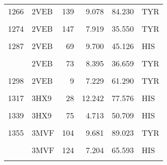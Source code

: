 \begin{table}
\begin{tabular}{llrrrl}
			1266 & 2VEB & 139 & 9.078 & 84.230 & TYR\\
			\addlinespace
			\cellcolor{gray!6}{1268} & \cellcolor{gray!6}{2VEB} & \cellcolor{gray!6}{141} & \cellcolor{gray!6}{4.252} & \cellcolor{gray!6}{67.226} & \cellcolor{gray!6}{TYR}\\
			1274 & 2VEB & 147 & 7.919 & 35.550 & TYR\\
			\cellcolor{gray!6}{1285} & \cellcolor{gray!6}{2VEB} & \cellcolor{gray!6}{61} & \cellcolor{gray!6}{7.823} & \cellcolor{gray!6}{23.496} & \cellcolor{gray!6}{TYR}\\
			1287 & 2VEB & 69 & 9.700 & 45.126 & HIS\\
			\cellcolor{gray!6}{1291} & \cellcolor{gray!6}{2VEB} & \cellcolor{gray!6}{72} & \cellcolor{gray!6}{10.947} & \cellcolor{gray!6}{86.614} & \cellcolor{gray!6}{TYR}\\
			\addlinespace
			1292 & 2VEB & 73 & 8.395 & 36.659 & TYR\\
			\cellcolor{gray!6}{1295} & \cellcolor{gray!6}{2VEB} & \cellcolor{gray!6}{85} & \cellcolor{gray!6}{7.353} & \cellcolor{gray!6}{68.252} & \cellcolor{gray!6}{TYR}\\
			1298 & 2VEB & 9 & 7.229 & 61.290 & TYR\\
			\cellcolor{gray!6}{1314} & \cellcolor{gray!6}{3HX9} & \cellcolor{gray!6}{25} & \cellcolor{gray!6}{10.506} & \cellcolor{gray!6}{40.629} & \cellcolor{gray!6}{HIS}\\
			1317 & 3HX9 & 28 & 12.242 & 77.576 & HIS\\
			\addlinespace
			\cellcolor{gray!6}{1328} & \cellcolor{gray!6}{3HX9} & \cellcolor{gray!6}{56} & \cellcolor{gray!6}{10.073} & \cellcolor{gray!6}{84.565} & \cellcolor{gray!6}{HIS}\\
			1339 & 3HX9 & 75 & 4.713 & 50.709 & HIS\\
			\cellcolor{gray!6}{1340} & \cellcolor{gray!6}{3HX9} & \cellcolor{gray!6}{78} & \cellcolor{gray!6}{7.572} & \cellcolor{gray!6}{67.872} & \cellcolor{gray!6}{HIS}\\
			1355 & 3MVF & 104 & 9.681 & 89.023 & TYR\\
			\cellcolor{gray!6}{1356} & \cellcolor{gray!6}{3MVF} & \cellcolor{gray!6}{105} & \cellcolor{gray!6}{8.198} & \cellcolor{gray!6}{68.065} & \cellcolor{gray!6}{TYR}\\
			\addlinespace
			1362 & 3MVF & 124 & 7.204 & 65.593 & HIS\\
			\cellcolor{gray!6}{1367} & \cellcolor{gray!6}{3MVF} & \cellcolor{gray!6}{134} & \cellcolor{gray!6}{5.389} & \cellcolor{gray!6}{81.636} & \cellcolor{gray!6}{TYR}\\

\end{tabular}
\end{table}
